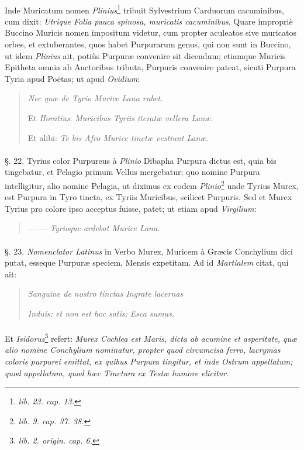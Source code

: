 \documentclass[a4paper, 11pt, oneside, polutonikogreek, german]{article}
\begin{document}
\paragraph{}
Inde Muricatum nomen \emph{Plinius}\footnote{\emph{lib. 23. cap. 13.}} tribuit Sylvestrium Carduorum cacuminibus, cum dixit: \emph{Utrique Folia pauca spinosa, muricatis cacuminibus}. Quare impropriè Buccino Muricis nomen impositum videtur, cum propter aculeatos sive muricatos orbes, et extuberantes, quos habet Purpurarum genus, qui non sunt in Buccino, ut idem \emph{Plinius} ait, potiùs Purpuræ convenire sit dicendum; etiamque Muricis Epitheta omnia ab Auctoribus tributa, Purpuris convenire pateat, sicuti Purpura Tyria apud Poëtas; ut apud \emph{Ovidium}:
\begin{quotation}
\hspace*{15mm}\emph{Nec quæ de Tyrio Murice Lana rubet.}

Et \emph{Horatius}: \emph{Muricibus Tyriis iteratæ vellera Lanæ}.

Et alibi: \emph{Te bis Afro Murice tinctæ vestiunt Lanæ}.
\end{quotation}
\paragraph{}
§. 22. Tyrius color Purpureus à \emph{Plinio} Dibapha Purpura dictus est, quia bis tingebatur, et Pelagio primum Vellus mergebatur; quo nomine Purpura intelligitur, alio nomine Pelagia, ut diximus ex eodem \emph{Plinio}\footnote{\emph{lib. 9. cap. 37. 38.}} unde Tyrius Murex, est Purpura in Tyro tincta, ex Tyriis Muricibus, scilicet Purpuris. Sed et Murex Tyrius pro colore ipso acceptus fuisse, patet; ut etiam apud \emph{Virgilium}:
\begin{quotation}
--- --- \emph{Tyrioque ardebat Murice Lana.}
\end{quotation}
\paragraph{}
§. 23. \emph{Nomenclator Latinus} in Verbo Murex, Muricem à Græcis Conchylium dici putat, esseque Purpuræ speciem, Mensis expetitam. Ad id \emph{Martialem} citat, qui ait:
\begin{quotation}
\emph{Sanguine de nostro tinctas Ingrate lacernas}

\emph{Induis: et non est hoc satis; Esca sumus.}
\end{quotation}
\paragraph{}
Et \emph{Isidorus}\footnote{\emph{lib. 2. origin. cap. 6.}} refert: \emph{Murex Cochlea est Maris, dicta ab acumine et asperitate, quæ alio nomine Conchylium nominatur, propter quod circumcisa ferro, lacrymas coloris purpurei emittat, ex quibus Purpura tingitur, et inde Ostrum appellatum; quod appellatum, quod hæc Tinctura ex Testæ humore elicitur.}
\end{document}
